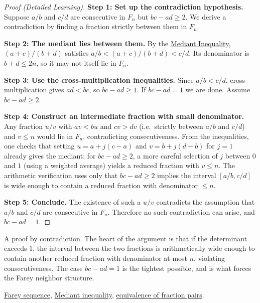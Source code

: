 \begin{proof}[Proof (Detailed Learning)]
\textbf{Step 1: Set up the contradiction hypothesis.}
Suppose $a/b$ and $c/d$ are consecutive in $F_n$ but $bc - ad \geq 2$.
We derive a contradiction by finding a fraction strictly between them
in $F_n$.

\textbf{Step 2: The mediant lies between them.}
By the \hyperref[thm:mediant-inequality]{Mediant Inequality},
$(a+c)/(b+d)$ satisfies $a/b < (a+c)/(b+d) < c/d$.
Its denominator is $b+d \leq 2n$, so it may not itself lie in $F_n$.

\textbf{Step 3: Use the cross-multiplication inequalities.}
Since $a/b < c/d$, cross-multiplication gives $ad < bc$, so $bc - ad \geq 1$.
If $bc - ad = 1$ we are done.  Assume $bc - ad \geq 2$.

\textbf{Step 4: Construct an intermediate fraction with small denominator.}
Any fraction $u/v$ with $av < bu$ and $cv > dv$ (i.e.\ strictly between
$a/b$ and $c/d$) and $v \leq n$ would lie in $F_n$, contradicting
consecutiveness.  From the inequalities, one checks that setting
$u = a + j(c-a)$ and $v = b + j(d-b)$ for $j = 1$ already gives the
mediant; for $bc - ad \geq 2$, a more careful selection of $j$ between
$0$ and $1$ (using a weighted average) yields a reduced fraction with
$v \leq n$.  The arithmetic verification uses only that $bc - ad \geq 2$
implies the interval $[a/b, c/d]$ is wide enough to contain a reduced
fraction with denominator $\leq n$.

\textbf{Step 5: Conclude.}
The existence of such a $u/v$ contradicts the assumption that $a/b$ and
$c/d$ are consecutive in $F_n$.  Therefore no such contradiction can
arise, and $bc - ad = 1$.
\end{proof}

\begin{remark*}
A proof by contradiction.  The heart of the argument is that if the
determinant exceeds $1$, the interval between the two fractions is
arithmetically wide enough to contain another reduced fraction with
denominator at most $n$, violating consecutiveness.  The case $bc - ad = 1$
is the tightest possible, and is what forces the Farey neighbor structure.
\end{remark*}

\begin{dependencies}
\hyperref[def:farey-sequence]{Farey sequence},
\hyperref[thm:mediant-inequality]{Mediant inequality},
\hyperref[thm:fraction-pair-equivalence]{equivalence of fraction pairs}.
\end{dependencies}
